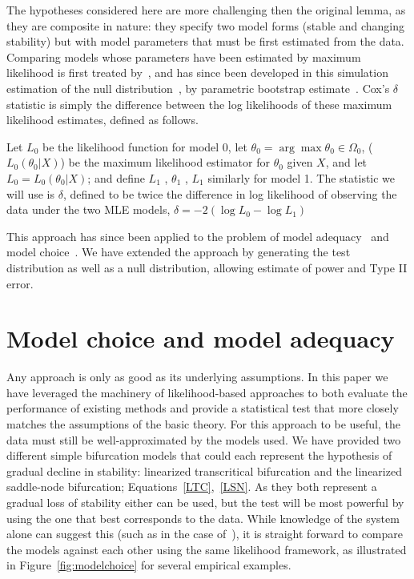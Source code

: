 \documentclass[authoryear, preprint,review,12pt]{elsarticle}
\begin{document}
The hypotheses considered here are more challenging then the original lemma, as they are composite in nature:
they specify two model forms (stable and changing stability)
but with model parameters that must be first estimated from the data.
Comparing models whose parameters have been estimated by maximum likelihood is first treated by~\citet{Cox1961, Cox1962},
and has since been developed in this simulation estimation of the null distribution~\citep{McLachlan1987}, by parametric bootstrap estimate~\citep{Efron1987}.  
Cox's $\delta$ statistic is simply the difference between the log likelihoods of these maximum likelihood estimates, defined as follows.

Let $L_0$ be the likelihood function for model 0, let $\theta_0 = \arg \max \theta_0 \in \Omega_0$, ($L_0 (\theta_0 |X)$) be the maximum likelihood estimator for $\theta_0$ given $X$, and let $L_0 = L_0 (\theta_0 |X)$; and define $L_1$ , $\theta_1$ , $L_1$ similarly for model 1. The statistic we will use is $\delta$, defined to be twice the difference in log likelihood of observing the data under the two MLE models,
$\delta = -2 (\log L_0 - \log L_1 )$

This approach has since been applied to the problem of model adequacy~\citep{Goldman1993} and model choice~\citep{Huelsenbeck1996}.  
We have extended the approach by generating the test distribution as well as a null distribution, allowing estimate of power and Type II error.  



\section{Model choice and model adequacy}\label{modelchoice}
Any approach is only as good as its underlying assumptions.  In this paper we have leveraged the machinery of likelihood-based approaches to both evaluate the performance of existing methods and provide a statistical test that more closely matches the assumptions of the basic theory.  For this approach to be useful, the data must still be well-approximated by the models used.  We have provided two different simple bifurcation models that could each represent the hypothesis of gradual decline in stability: linearized transcritical bifurcation and the linearized saddle-node bifurcation; Equations~\eqref{LTC},~\eqref{LSN}.  As they both represent a gradual loss of stability either can be used, but the test will be most powerful by using the one that best corresponds to the data.  While knowledge of the system alone can suggest this (such as in the case of~\citet{Drake2010}), it is straight forward to compare the models against each other using the same likelihood framework, as illustrated in Figure~\ref{fig:modelchoice} for several empirical examples.  
\end{document}
